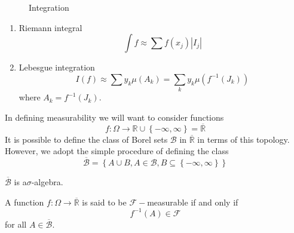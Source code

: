     \begin{figure}[!htb]
 	\centering
 	\label{img101}\qquad \qquad 
 	\label{img102}
 	\caption{Integration}
 \end{figure}

\begin{enumerate}
	\item Riemann integral
	\begin{equation}
	\int f  \approx \sum {f\left( {{x_j}} \right)} \left| {{I_j}} \right|
	\label{eq10.3}
	\end{equation}
	\item Lebesgue integration
	\begin{equation}
	I\left( f \right) \approx \sum {{y_k}\mu \left( {{A_k}} \right)}  = \sum\limits_k {{y_k}\mu \left( {{f^{ - 1}}\left( {{J_k}} \right)} \right)} 
	\end{equation}
	where ${A_k} = {f^{ - 1}}\left( {{J_k}} \right)$.
\end{enumerate}

In defining measurability we will want to consider functions
\begin{equation}
f:\Omega  \to \mathbb{R} \cup \left\{ { - \infty ,\infty } \right\} = \overline {\mathbb{R}}
\label{eq10.5}
\end{equation}
It is possible to define the class of Borel sets $\mathcal{B}$ in $ \overline {\mathbb{R}} $ in terms of this topology. However, we adopt the simple procedure of defining the class 
\begin{equation}
\overline {\mathcal{B}}  = \left\{ {A \cup B,A \in {\mathcal{B}},B \subseteq \left\{ { - \infty ,\infty } \right\}} \right\}
\label{eq10.6}
\end{equation}

\begin{proposition}
	$ \overline {\mathcal{B}} $ is a$ \sigma $-algebra.
\end{proposition}

\begin{definition}
	A function $f:\Omega  \to \overline {\mathbb{R}} $ is said to be $\mathcal{F}-$measurable if and only if 
	\begin{equation}
	{f^{ - 1}}\left( A \right) \in \mathcal{F}
	\end{equation}
	for all $A \in \overline {\mathcal{B}} $.
	\label{def10.1}
\end{definition}

